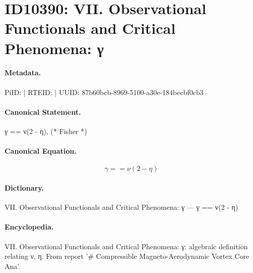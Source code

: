\section*{ID10390: VII. Observational Functionals and Critical Phenomena: γ}
\paragraph{Metadata.}
PiID:  | RTEID:  | UUID: 87b60bcb-8969-5100-a30e-184becbf0cb3

\paragraph{Canonical Statement.}
γ == ν(2 - η), (* Fisher *)

\paragraph{Canonical Equation.}
\[
γ == ν(2 - η)
\]

\paragraph{Dictionary.}
VII. Observational Functionals and Critical Phenomena: γ — γ == ν(2 - η)

\paragraph{Encyclopedia.}
VII. Observational Functionals and Critical Phenomena: γ: algebraic definition relating ν, η. From report '\# Compressible Magneto-Aerodynamic Vortex Core Ana'.
